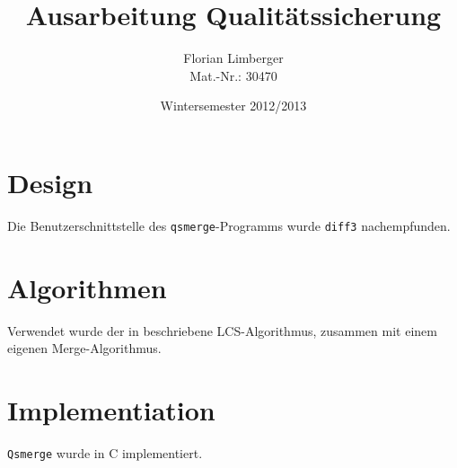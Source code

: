 \documentclass[a4paper,titlepage,12pt]{scrartcl}
\begin{document}
\titlehead{%
	\texttt{[image: i/hska\_logo.png]}
}

\title{Ausarbeitung Qualitätssicherung}
\author{Florian Limberger \\ Mat.-Nr.: 30470}
\date{Wintersemester 2012/2013}
\publishers{%
    \textbf{Betreuer:} Prof.\,Dr. Dirk W. Hoffmann
}
\maketitle

\tableofcontents

\clearpage

\section{Design}
\label{sec:design}
Die Benutzerschnittstelle des \texttt{qsmerge}-Programms wurde \texttt{diff3}
nachempfunden.

\section{Algorithmen}
Verwendet wurde der in \citet{web:eppstein} beschriebene LCS-Algorithmus,
zusammen mit einem eigenen Merge-Algorithmus.

\section{Implementiation}
\texttt{Qsmerge} wurde in C implementiert.

\clearpage




\end{document}
